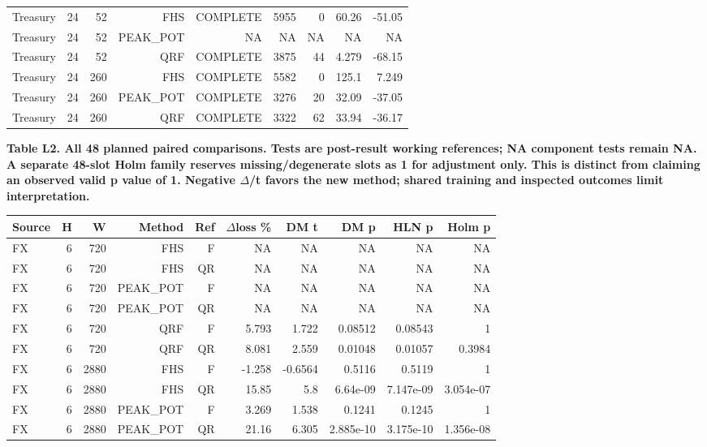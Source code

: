 \documentclass[10pt,a4paper]{article}
\begin{document}
\begin{center}
\begin{minipage}{\linewidth}
\begin{tabular}{lrrrrrrrr}
Treasury & 24 & 52 & FHS & COMPLETE & 5955 & 0 & 60.26 & -51.05 \\
Treasury & 24 & 52 & PEAK\_POT & NA & NA & NA & NA & NA \\
Treasury & 24 & 52 & QRF & COMPLETE & 3875 & 44 & 4.279 & -68.15 \\
Treasury & 24 & 260 & FHS & COMPLETE & 5582 & 0 & 125.1 & 7.249 \\
Treasury & 24 & 260 & PEAK\_POT & COMPLETE & 3276 & 20 & 32.09 & -37.05 \\
Treasury & 24 & 260 & QRF & COMPLETE & 3322 & 62 & 33.94 & -36.17 \\
\bottomrule
\end{tabular}
\end{minipage}
\end{center}
\begin{center}
\begin{minipage}{\linewidth}
\small\textbf{Table L2. All 48 planned paired comparisons. Tests are post-result working references; NA component tests remain NA. A separate 48-slot Holm family reserves missing/degenerate slots as 1 for adjustment only. This is distinct from claiming an observed valid p value of 1. Negative \(\Delta\)/t favors the new method; shared training and inspected outcomes limit interpretation.}\par\medskip
\centering\fontsize{8}{10}\selectfont
\begin{tabular}{lrrrrrrrrr}
\toprule
Source & H & W & Method & Ref & \(\Delta\)loss \% & DM t & DM p & HLN p & Holm p \\
\midrule
FX & 6 & 720 & FHS & F & NA & NA & NA & NA & NA \\
FX & 6 & 720 & FHS & QR & NA & NA & NA & NA & NA \\
FX & 6 & 720 & PEAK\_POT & F & NA & NA & NA & NA & NA \\
FX & 6 & 720 & PEAK\_POT & QR & NA & NA & NA & NA & NA \\
FX & 6 & 720 & QRF & F & 5.793 & 1.722 & 0.08512 & 0.08543 & 1 \\
FX & 6 & 720 & QRF & QR & 8.081 & 2.559 & 0.01048 & 0.01057 & 0.3984 \\
FX & 6 & 2880 & FHS & F & -1.258 & -0.6564 & 0.5116 & 0.5119 & 1 \\
FX & 6 & 2880 & FHS & QR & 15.85 & 5.8 & 6.64e-09 & 7.147e-09 & 3.054e-07 \\
FX & 6 & 2880 & PEAK\_POT & F & 3.269 & 1.538 & 0.1241 & 0.1245 & 1 \\
FX & 6 & 2880 & PEAK\_POT & QR & 21.16 & 6.305 & 2.885e-10 & 3.175e-10 & 1.356e-08 \\

\end{tabular}
\end{minipage}
\end{center}
\end{document}
